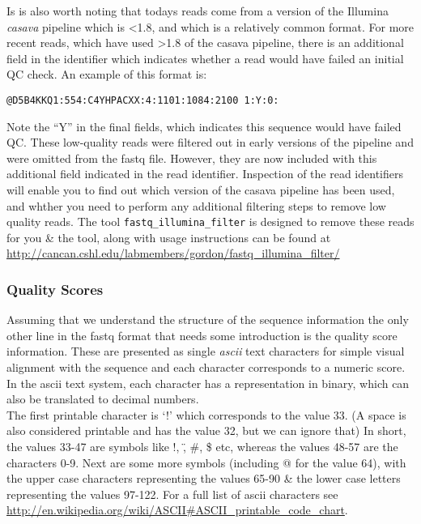 \begin{information}
Is is also worth noting that todays reads come from a version of the Illumina \textit{casava} pipeline which is \textless 1.8, and which is a relatively common format.
For more recent reads, which have used \textgreater 1.8 of the casava pipeline, there is an additional field in the identifier which indicates whether a read would have failed an initial QC check. 
An example of this format is:
\begin{lstlisting}
@D5B4KKQ1:554:C4YHPACXX:4:1101:1084:2100 1:Y:0:
\end{lstlisting}
Note the ``Y'' in the final fields, which indicates this sequence would have failed QC.
These low-quality reads were filtered out in early versions of the pipeline and were omitted from the fastq file.
However, they are now included with this additional field indicated in the read identifier.
Inspection of the read identifiers will enable you to find out which version of the casava pipeline has been used, and whther you need to perform any additional filtering steps to remove low quality reads. 
The tool \texttt{fastq_illumina_filter} is designed to remove these reads for you \& the tool, along with usage instructions can be found at \url{http://cancan.cshl.edu/labmembers/gordon/fastq_illumina_filter/}\\
\end{information}

\subsubsection{Quality Scores}
\begin{information}
Assuming that we understand the structure of the sequence information the only other line in the fastq format that needs some introduction is the quality score information.
These are presented as single \textit{ascii} text characters for simple visual alignment with the sequence and each character corresponds to a numeric score.
In the ascii text system, each character has a representation in binary, which can also be translated to decimal numbers.\\

The first printable character is `!' which corresponds to the value 33. 
(A space is also considered printable and has the value 32, but we can ignore that)
In short, the values 33-47 are symbols like !, \", \#, \$ etc, whereas the values 48-57 are the characters 0-9.
Next are some more symbols (including @ for the value 64), with the upper case characters representing the values 65-90 \& the lower case letters representing the values 97-122.
For a full list of ascii characters see \url{http://en.wikipedia.org/wiki/ASCII#ASCII_printable_code_chart}.
\end{information}

